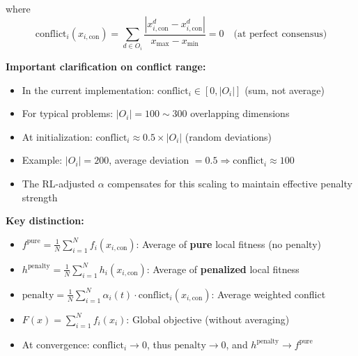 \documentclass[11pt,a4paper]{article}
\begin{document}
where
\begin{equation}
\text{conflict}_i(x_{i,\text{con}}) = \sum_{d \in O_i} \frac{|x_{i,\text{con}}^d - x_{i,\text{con}}^d|}{x_{\max} - x_{\min}} = 0 \quad \text{(at perfect consensus)}
\end{equation}

\textbf{Important clarification on conflict range:}
\begin{itemize}
    \item In the current implementation: $\text{conflict}_i \in [0, |O_i|]$ (sum, not average)
    \item For typical problems: $|O_i| = 100 \sim 300$ overlapping dimensions
    \item At initialization: $\text{conflict}_i \approx 0.5 \times |O_i|$ (random deviations)
    \item Example: $|O_i| = 200$, average deviation $= 0.5 \Rightarrow \text{conflict}_i \approx 100$
    \item The RL-adjusted $\alpha$ compensates for this scaling to maintain effective penalty strength
\end{itemize}

\textbf{Key distinction:}
\begin{itemize}
    \item $f^{\text{pure}} = \frac{1}{N}\sum_{i=1}^N f_i(x_{i,\text{con}})$: Average of \textbf{pure} local fitness (no penalty)
    \item $h^{\text{penalty}} = \frac{1}{N}\sum_{i=1}^N h_i(x_{i,\text{con}})$: Average of \textbf{penalized} local fitness
    \item $\text{penalty} = \frac{1}{N}\sum_{i=1}^N \alpha_i(t) \cdot \text{conflict}_i(x_{i,\text{con}})$: Average weighted conflict
    \item $F(x) = \sum_{i=1}^N f_i(x_i)$: Global objective (without averaging)
    \item At convergence: $\text{conflict}_i \to 0$, thus $\text{penalty} \to 0$, and $h^{\text{penalty}} \to f^{\text{pure}}$
\end{itemize}
\end{document}
